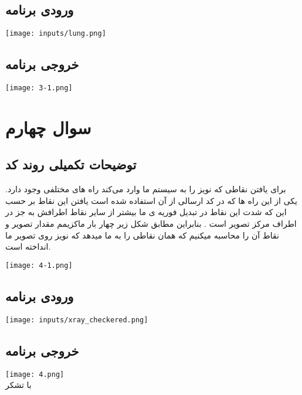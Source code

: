 \documentclass[12pt]{article}
\begin{document}
		\subsection{ورودی برنامه}
		\texttt{[image: inputs/lung.png]}
		\subsection{خروجی برنامه}
		\texttt{[image: 3-1.png]}
		
		
		\newpage
		
		\section{سوال چهارم }
		\subsection{توضیحات تکمیلی روند کد}
	برای یافتن نقاطی که نویز را به سیستم ما وارد می‌کند راه های مختلفی وجود دارد.
	یکی از این راه ها که در کد ارسالی از آن استفاده شده است یافتن این نقاط بر حسب این که شدت این نقاط در تبدیل فوریه ی ما بیشتر از سایر نقاط اطرافش به جز در اطراف مرکز تصویر است .
	بنابراین مطابق شکل زیر چهار بار ماکزیمم مقدار تصویر و نقاط آن را محاسبه میکنیم که همان نقاطی را به ما میدهد که نویز روی تصویر ما انداخته است.
	
	\vspace{1cm} 
	
	\texttt{[image: 4-1.png]}
		\subsection{ورودی برنامه}
		\texttt{[image: inputs/xray\_checkered.png]}
		\subsection{خروجی برنامه}
		\texttt{[image: 4.png]}\\
		
		با تشکر
		\newpage
\end{document}
